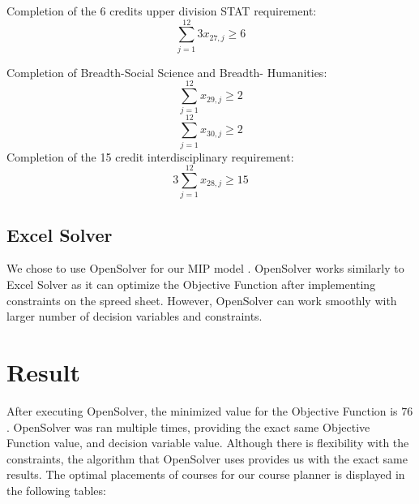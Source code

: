 \documentclass{article}
\begin{document}
\noindent
Completion of the 6 credits upper division STAT requirement:
$$ \sum_{j=1}^{12} 3x_{27,j} \geq 6$$

\noindent
Completion of Breadth-Social Science and Breadth- Humanities:
$$\sum_{j=1}^{12} x_{29,j} \geq 2$$
$$ \sum_{j=1}^{12} x_{30,j} \geq 2$$
\noindent
Completion of the 15 credit interdisciplinary requirement:
$$ 3 \sum_{j=1}^{12} x_{28,j} \geq 15$$




\subsection{Excel Solver}
 We chose to use OpenSolver for our MIP model \cite{OpenSolver}. OpenSolver works similarly to Excel Solver as it can optimize the Objective Function after implementing constraints on the spreed sheet. However, OpenSolver can work smoothly with larger number of decision variables and constraints. 
\section{Result}
After executing OpenSolver, the minimized value for the Objective Function is $76$. OpenSolver was ran multiple times, providing the exact same Objective Function value, and decision variable value. Although there is flexibility with the constraints, the algorithm that OpenSolver uses provides us with the exact same results. The optimal placements of courses for our course planner is displayed in the following tables:
\end{document}
